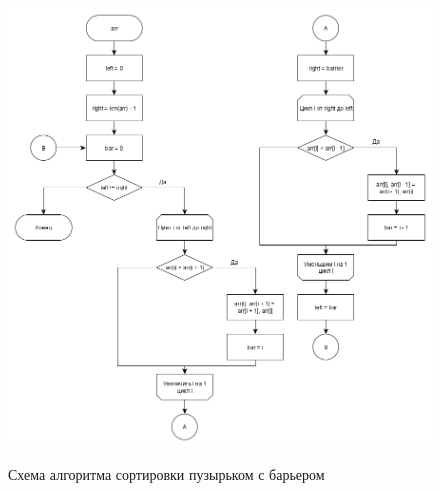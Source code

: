 \documentclass[a4paper, 14pt]{article}
\begin{document}
        	\begin{figure}[h]
        	\begin{center}
        		{\includegraphics[scale=0.41]{shaker_scheme}}
        		\caption{Схема алгоритма сортировки пузырьком с барьером}
        	\end{center}
        \end{figure}
\end{document}
